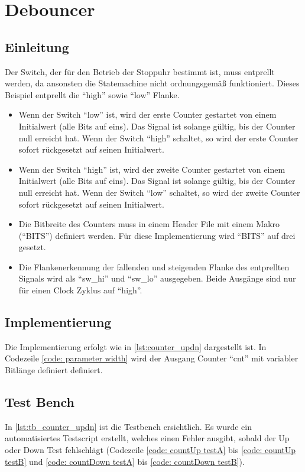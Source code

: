 \documentclass[./\jobname.tex]{subfiles}
\begin{document}
%
\def\codeFolderName{debounce}
%
\chapter{Debouncer}
%
\section{Einleitung}
%
Der Switch, der für den Betrieb der Stoppuhr bestimmt ist, muss entprellt werden, da ansonsten die Statemachine nicht ordnungsgemäß funktioniert. Dieses Beispiel entprellt die \enquote{high} sowie \enquote{low} Flanke.
%
\begin{itemize}
	\item Wenn der Switch \enquote{low} ist, wird der erste Counter gestartet von einem Initialwert (alle Bits auf eins). Das Signal ist solange gültig, bis der Counter null erreicht hat. Wenn der Switch \enquote{high} schaltet, so wird der erste Counter sofort rückgesetzt auf seinen Initialwert.
	\item Wenn der Switch \enquote{high} ist, wird der zweite Counter gestartet von einem Initialwert (alle Bits auf eins). Das Signal ist solange gültig, bis der Counter null erreicht hat. Wenn der Switch \enquote{low} schaltet, so wird der zweite Counter sofort rückgesetzt auf seinen Initialwert.
	\item Die Bitbreite des Counters muss in einem Header File mit einem Makro (\enquote{BITS}) definiert werden. Für diese Implementierung wird \enquote{BITS} auf drei gesetzt.
	\item Die Flankenerkennung der fallenden und steigenden Flanke des entprellten Signals wird als \enquote{sw\_hi} und \enquote{sw\_lo} ausgegeben. Beide Ausgänge sind nur für einen Clock Zyklus auf \enquote{high}.
\end{itemize}
%
\section{Implementierung}
%
Die Implementierung erfolgt wie in \autoref{lst:counter_updn} dargestellt ist. In Codezeile \cref{code: parameter width} wird der Ausgang Counter \enquote{cnt} mit variabler Bitlänge definiert definiert.
%

%
\section{Test Bench}
%
In \autoref{lst:tb_counter_updn} ist die Testbench ersichtlich. Es wurde ein automatisiertes Testscript erstellt, welches einen Fehler ausgibt, sobald der Up oder Down Test fehlschlägt (Codezeile \ref{code: countUp testA} bis \ref{code: countUp testB} und \ref{code: countDown testA} bis \ref{code: countDown testB}). 
%

%
\end{document}
